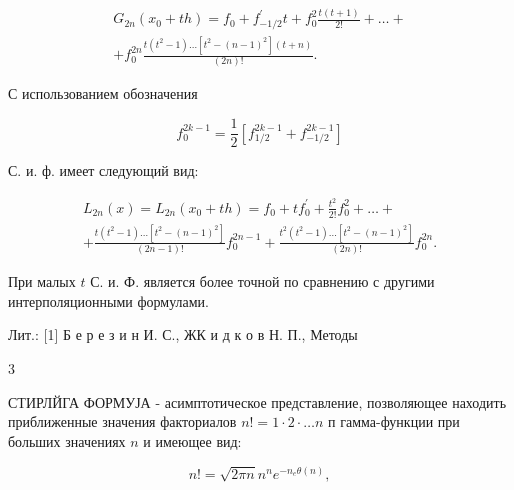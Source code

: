 \documentclass[10pt]{article}
\begin{document}
\[

\begin{gathered}

G_{2 n}\left(x_{0}+t h\right)=f_{0}+f_{-1 / 2}^{\prime} t+f_{0}^{2} \frac{t(t+1)}{2 !}+\ldots+ \\

+f_{0}^{2 n} \frac{t\left(t^{2}-1\right) \ldots\left[t^{2}-(n-1)^{2}\right](t+n)}{(2 n) !} .

\end{gathered}

\]



С использованием обозначения



\[

f_{0}^{2 k-1}=\frac{1}{2}\left[f_{1 / 2}^{2 k-1}+f_{-1 / 2}^{2 k-1}\right]

\]



С. и. ф. имеет следующий вид:



\[

\begin{gathered}

L_{2 n}(x)=L_{2 n}\left(x_{0}+t h\right)=f_{0}+t f_{0}^{\prime}+\frac{t^{2}}{2 !} f_{0}^{2}+\ldots+ \\

+\frac{t\left(t^{2}-1\right) \ldots\left[t^{2}-(n-1)^{2}\right]}{(2 n-1) !} f_{0}^{2 n-1}+\frac{t^{2}\left(t^{2}-1\right) \ldots\left[t^{2}-(n-1)^{2}\right]}{(2 n) !} f_{0}^{2 n} .

\end{gathered}

\]



При малых $t$ С. и. Ф. является более точной по сравнению с другими интерполяционными формулами.



Лит.: [1] Б е р е з и н И. С., ЖК и д к о в Н. П., Методы

3



СТИРЛЙГА ФОРМУЈА - асимптотическое представление, позволяющее находить приближенные значения факториалов $n !=1 \cdot 2 \cdot \ldots n$ п гамма-функции при больших значениях $n$ и имеющее вид:



\[

n !=\sqrt{2 \pi n} n^{n} e^{-n_{e} \theta(n)},

\]
\end{document}
